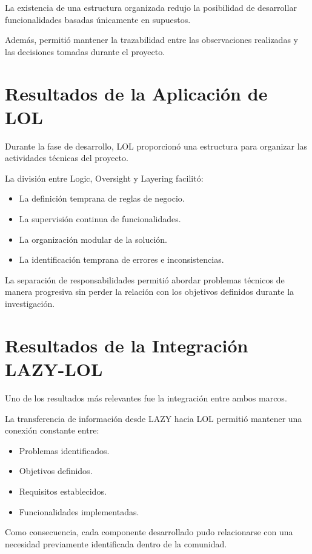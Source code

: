 \documentclass[14pt,a4paper,oneside]{extbook}
\begin{document}
La existencia de una estructura organizada redujo la posibilidad de desarrollar funcionalidades basadas únicamente en supuestos.

Además, permitió mantener la trazabilidad entre las observaciones realizadas y las decisiones tomadas durante el proyecto.

\section{Resultados de la Aplicación de LOL}

Durante la fase de desarrollo, LOL proporcionó una estructura para organizar las actividades técnicas del proyecto.

La división entre Logic, Oversight y Layering facilitó:

\begin{itemize}
\item La definición temprana de reglas de negocio.
\item La supervisión continua de funcionalidades.
\item La organización modular de la solución.
\item La identificación temprana de errores e inconsistencias.
\end{itemize}

La separación de responsabilidades permitió abordar problemas técnicos de manera progresiva sin perder la relación con los objetivos definidos durante la investigación.

\section{Resultados de la Integración LAZY-LOL}

Uno de los resultados más relevantes fue la integración entre ambos marcos.

La transferencia de información desde LAZY hacia LOL permitió mantener una conexión constante entre:

\begin{itemize}
\item Problemas identificados.
\item Objetivos definidos.
\item Requisitos establecidos.
\item Funcionalidades implementadas.
\end{itemize}

Como consecuencia, cada componente desarrollado pudo relacionarse con una necesidad previamente identificada dentro de la comunidad.
\end{document}
